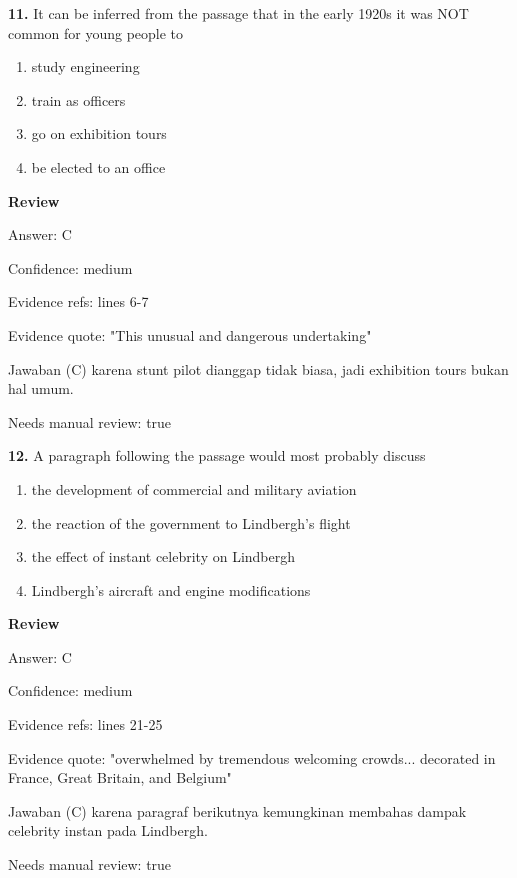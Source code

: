 \documentclass[12pt]{article}
\begin{document}
\noindent\textbf{11.} It can be inferred from the passage that in the early 1920s it was NOT common for young people to
\begin{enumerate}[label=(\Alph*),leftmargin=*,itemsep=0.2em]
\item study engineering
\item train as officers
\item go on exhibition tours
\item be elected to an office
\end{enumerate}
\par
\begingroup
\setlength{\parskip}{0pt}
\setlength{\parindent}{0pt}
\textbf{Review}\par
Answer: C\par
Confidence: medium\par
Evidence refs: lines 6-7\par
Evidence quote: "This unusual and dangerous undertaking"\par
Jawaban (C) karena stunt pilot dianggap tidak biasa, jadi exhibition tours bukan hal umum.\par
Needs manual review: true\par
\endgroup
\par
\vspace{0.25\baselineskip}
\noindent\textbf{12.} A paragraph following the passage would most probably discuss
\begin{enumerate}[label=(\Alph*),leftmargin=*,itemsep=0.2em]
\item the development of commercial and military aviation
\item the reaction of the government to Lindbergh's flight
\item the effect of instant celebrity on Lindbergh
\item Lindbergh's aircraft and engine modifications
\end{enumerate}
\par
\begingroup
\setlength{\parskip}{0pt}
\setlength{\parindent}{0pt}
\textbf{Review}\par
Answer: C\par
Confidence: medium\par
Evidence refs: lines 21-25\par
Evidence quote: "overwhelmed by tremendous welcoming crowds... decorated in France, Great Britain, and Belgium"\par
Jawaban (C) karena paragraf berikutnya kemungkinan membahas dampak celebrity instan pada Lindbergh.\par
Needs manual review: true\par
\endgroup
\par
\vspace{0.25\baselineskip}
\end{document}

